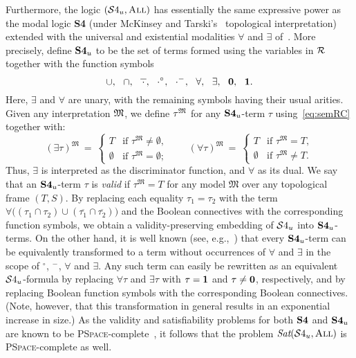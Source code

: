 \documentclass{LMCS}
\theoremstyle{plain}
\newcommand{\ti}[2][]{#2^{\circ_{#1}}}
\newcommand{\tc}[2][]{#2^{-_{#1}}}
\newcommand{\Sat}{\textit{Sat}}
\newcommand{\All}{\textsc{All}}
\newcommand{\PSpace}{\textsc{PSpace}}
\newcommand{\Res}{{S}}\newcommand{\RegC}{\textsc{RC}}
\begin{document}
Furthermore, the logic $(\SFU, \All)$ has essentially the same
expressive power as the modal logic \textbf{S4} (under
McKinsey and Tarski's~\cite{McKinsey&Tarski44} topological
interpretation) extended with the universal and existential modalities
$\forall$ and $\exists$ of~\cite{Goranko&Passy92}. More precisely,
define ${\bf S4}_u$ to be the set of terms formed using the variables
in $\mathcal{R}$ together with the function symbols
\begin{equation*}
   \cup, \ \ \cap, \ \ \overline{\, \cdot\, }, \ \ \ti{\cdot}, \ \ \tc{\cdot}, \ \ \forall, \ \ \exists, \ \ \zero, \ \ \one.
\end{equation*}
Here, $\exists$ and $\forall$ are unary, with the remaining symbols
having their usual arities.  Given any interpretation $\mathfrak{M}$, we define
$\tau^{\mathfrak{M}}$ for any ${\bf S4}_u$-term $\tau$ using~\eqref{eq:semRC} together with:
$$
(\exists \tau)^\mathfrak M ~=~
\begin{cases}
T & \text{if $\tau^\mathfrak M \ne \emptyset$},\\
\emptyset & \text{if $\tau^\mathfrak M = \emptyset$};
\end{cases} \qquad
(\forall \tau)^\mathfrak M ~=~
\begin{cases}
T & \text{if $\tau^\mathfrak M = T$},\\
\emptyset & \text{if $\tau^\mathfrak M \ne T$}.
\end{cases}
$$
Thus, $\exists$ is interpreted as the discriminator function, and $\forall$
as its dual. We say that an ${\bf S4}_u$-term $\tau$ is \emph{valid}
if $\tau^\mathfrak M = T$ for any model $\mathfrak M$ over any
topological frame $(T, \Res)$. By replacing each equality $\tau_1 =
\tau_2$ with the term $\forall \big( (\tau_1 \cap \tau_2) \cup
(\overline{\tau_1} \cap \overline{\tau_2}) \big)$ and the Boolean
connectives with the corresponding function symbols, we obtain a
validity-preserving embedding of $\mathcal{S}4_u$ into ${\bf S4}_u$-terms. On
the other hand, it is well known (see,
e.g.,~\cite{Aiello&Benthem02,Hughes&Cresswell96}) that every ${\bf
  S4}_u$-term can be equivalently transformed to a term without
occurrences of $\forall$ and $\exists$ in the scope of $\ti{}$,
$\tc{}$, $\forall$ and $\exists$. Any such term can easily be
rewritten as an equivalent $\mathcal{S}4_u$-formula by replacing $\forall\tau$
and $\exists \tau$ with $\tau = \mathbf{1}$ and $\tau \ne \mathbf{0}$,
respectively, and by replacing Boolean function symbols with the
corresponding Boolean connectives. (Note, however, that this
transformation in general results in an exponential increase in size.)
As the validity and satisfiability problems for both ${\bf S4}$ and
${\bf S4}_u$ are known to
be \PSpace{}-complete~\cite{Ladner77,Nutt99,Arecesetal00}, it follows
that the problem $\Sat(\SFU,\All)$ is
\PSpace{}-complete as well.
\end{document}

